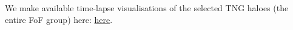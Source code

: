 \documentclass[fleqn,usenatbib]{mnras}
\newcommand{\rss}[1]{\textcolor{purple}{(rss: #1)}}
\begin{document}
We make available time-lapse visualisations of the selected TNG haloes (the entire FoF group) here: \href{https://drive.google.com/drive/folders/1AZX8eecrKwHGXtqGSf5XioXhI5kFkswI?usp=sharing}{here}.
\end{document}
